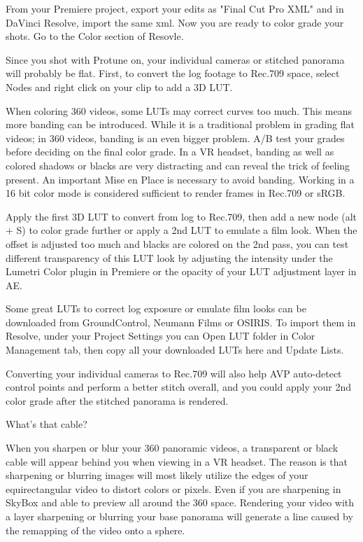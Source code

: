\begin{fullwidth}
From your Premiere project, export your edits as "Final Cut Pro XML" and in DaVinci Resolve, import the same xml. Now you are ready to color grade your shots. Go to the Color section of Resovle.


Since you shot with Protune on, your individual cameras or stitched panorama will probably be flat. First, to convert the log footage to Rec.709 space, select Nodes and right click on your clip to add a 3D LUT. 


When coloring 360 videos, some LUTs may correct curves too much. This means more banding can be introduced. While it is a traditional problem in grading flat videos; in 360 videos, banding is an even bigger problem. A/B test your grades before deciding on the final color grade. In a VR headset, banding as well as colored shadows or blacks are very distracting and can reveal the trick of feeling present. An important Mise en Place is necessary to avoid banding. Working in a 16 bit color mode is considered sufficient to render frames in Rec.709 or sRGB.


Apply the first 3D LUT to convert from log to Rec.709, then add a new node (alt + S) to color grade further or apply a 2nd LUT to emulate a film look. When the offset is adjusted too much and blacks are colored on the 2nd pass, you can test different transparency of  this LUT look by adjusting the intensity under the Lumetri Color plugin in Premiere or the opacity of your LUT adjustment layer in AE.


\tip Some great LUTs to correct log exposure or emulate film looks can be downloaded from GroundControl, Neumann Films or OSIRIS. To import them in Resolve, under your Project Settings you can Open LUT folder in Color Management tab, then copy all your downloaded LUTs here and Update Lists.  

Converting your individual cameras to Rec.709 will also help AVP auto-detect control points and perform a better stitch overall, and you could apply your 2nd color grade after the stitched panorama is rendered.

{\large What's that cable? \par}

When you sharpen or blur your 360 panoramic videos, a transparent or black cable will appear behind you when viewing in a VR headset. The reason is that sharpening or blurring images will most likely utilize the edges of your equirectangular video to distort colors or pixels. Even if you are sharpening in SkyBox and able to preview all around the 360 space. Rendering your video with a layer sharpening or blurring your base panorama will generate a line caused by the remapping of the video onto a sphere.


\end{fullwidth}

